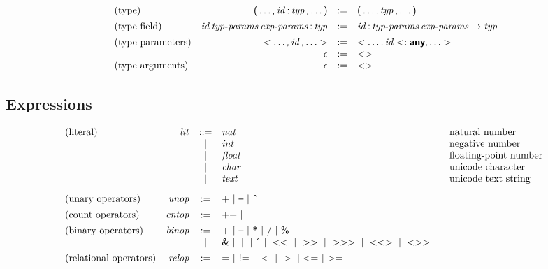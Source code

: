 $$
\begin{array}{@{}lrcl@{}}
\text{(type)} &
\K( \dots \K, \x{id} \K: \x{typ} \K, \dots \K) &:=&
  \K( \dots \K, \x{typ} \K, \dots \K) \\
[1ex]
\text{(type field)} &
\x{id} \x{typ-params} \x{exp-params} \K: \x{typ} &:=&
  \x{id} \K: \x{typ-params} \x{exp-params} \Kto \x{typ} \\
[1ex]
\text{(type parameters)} &
\Klt \dots \K, \x{id} \K, \dots \Kgt &:=&
  \Klt \dots \K, \x{id} \Ksub \KK{any} \K, \dots \Kgt \\&
\epsilon &:=&
  \Klt \Kgt \\
\text{(type arguments)} &
\epsilon &:=&
  \Klt \Kgt \\
\end{array}
$$


\subsection*{Expressions}

$$
\begin{array}{@{}lrcl@{\qquad}l}
\text{(literal)} & \x{lit} &::=&
  \x{nat}
    & \text{natural number} \\&&|&
  \x{int}
    & \text{negative number} \\&&|&
  \x{float}
    & \text{floating-point number} \\&&|&
  \x{char}
    & \text{unicode character} \\&&|&
  \x{text}
    & \text{unicode text string} \\
[2ex]
\text{(unary operators)} & \x{unop} &:=&
  \K{+} ~|~ \K\textendash ~|~ \K{\^{}} \\
[1ex]
\text{(count operators)} & \x{cntop} &:=&
  \K{++} ~|~ \K{\textendash\,\textendash} \\
[1ex]
\text{(binary operators)} & \x{binop} &:=&
  \K{+} ~|~ \K\textendash ~|~ \K{*} ~|~ \K{/} ~|~ \K{\%} \\&&|&
  \K{\&} ~|~ \;\K\textbar\; ~|~ \K{\^{}} ~|~ \Klt\Klt ~|~ \Kgt\Kgt ~|~ \Kgt\Kgt\Kgt ~|~ \Klt\Klt\Kgt ~|~ \Klt\Kgt\Kgt \\
[1ex]
\text{(relational operators)} & \x{relop} &:=&
  \K= ~|~ \K{!=} ~|~ \Klt ~|~ \Kgt ~|~ {\Klt}{\K=} ~|~ {\Kgt}{\K=} \\
\end{array}
$$

